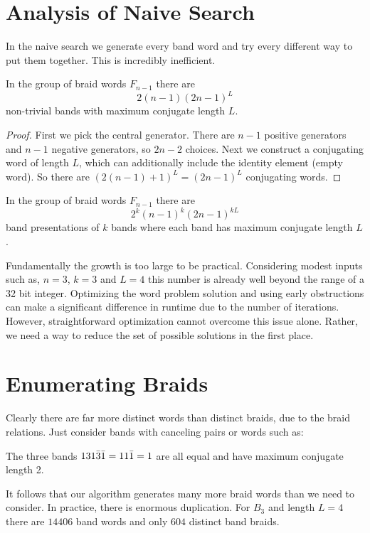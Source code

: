 \documentclass[12pt]{thesis}
\begin{document}
\section{Analysis of Naive Search}

In the naive search we generate every band word and try every different way to put them together.
This is incredibly inefficient.
\begin{proposition}
    In the group of braid words $F_{n-1}$ there are
    \begin{equation}
        2(n-1)(2n - 1)^{L}
    \end{equation}
    non-trivial bands with maximum conjugate length $L$.
\end{proposition}
\begin{proof}
    First we pick the central generator.
    There are $n-1$ positive generators and $n - 1$ negative generators,
    so $2n-2$ choices.
    Next we construct a conjugating word of length $L$, which can additionally include the identity element (empty word).
    So there are $(2(n-1) + 1)^{L} = (2n - 1)^{L}$ conjugating words.
\end{proof}

\begin{corollary}
    In the group of braid words $F_{n-1}$ there are
    \begin{equation}
        2^{k}(n-1)^{k}(2n-1)^{kL}
    \end{equation}
    band presentations of $k$ bands
    where each band has maximum conjugate length $L$.
\end{corollary}

Fundamentally the growth is too large to be practical.
Considering modest inputs such as, $n = 3$, $k = 3$ and $L = 4$ this number is already well beyond
the range of a 32 bit integer.
Optimizing the word problem solution and using early obstructions can make a significant difference in runtime due
to the number of iterations.
However, straightforward optimization cannot overcome this issue alone.
Rather, we need a way to reduce the set of possible solutions in the first place.

\section{Enumerating Braids}

Clearly there are far more distinct words than distinct braids,
due to the braid relations.
Just consider bands with canceling pairs or words such as:
\begin{example}
     The three bands $1 3 1 \bar{3} \bar{1} = 1 1 \bar{1} = 1$ are
     all equal and have maximum conjugate length 2.
\end{example}
It follows that our algorithm generates many more braid words than we need to consider.
In practice, there is enormous duplication.
For $B_{3}$ and length $L = 4$ there are $14406$ band words
and only $604$ distinct band braids.
\end{document}
